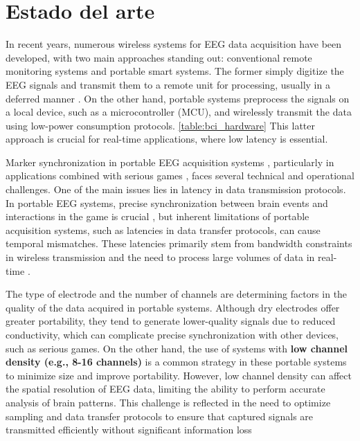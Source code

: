 \section{Estado del arte}\label{sec:stateofart}


In recent years, numerous wireless systems for EEG data acquisition have been developed, with two main approaches standing out: conventional remote monitoring systems and portable smart systems. The former simply digitize the EEG signals and transmit them to a remote unit for processing, usually in a deferred manner \cite{arpaia2020wearable}. On the other hand, portable systems preprocess the signals on a local device, such as a microcontroller (MCU), and wirelessly transmit the data using low-power consumption protocols. \ref{table:bci_hardware} This latter approach is crucial for real-time applications, where low latency is essential.

Marker synchronization in portable EEG acquisition systems \cite{razavi2022opensync}, particularly in applications combined with serious games \cite{damavsevivcius2023serious}, faces several technical and operational challenges. One of the main issues lies in latency in data transmission protocols. In portable EEG systems, precise synchronization between brain events and interactions in the game is crucial \cite{gomezromero2024implications}, but inherent limitations of portable acquisition systems, such as latencies in data transfer protocols, can cause temporal mismatches. These latencies primarily stem from bandwidth constraints in wireless transmission and the need to process large volumes of data in real-time \cite{he2023diversity}.

The type of electrode \cite{liu2023feature} and the number of channels \cite{abdullah2022eeg}  are determining factors in the quality of the data acquired in portable systems. Although dry electrodes offer greater portability, they tend to generate lower-quality signals due to reduced conductivity, which can complicate precise synchronization with other devices, such as serious games. On the other hand, the use of systems with \textbf{low channel density (e.g., 8-16 channels)} \cite{allouch2023effect} is a common strategy in these portable systems to minimize size and improve portability. However, low channel density can affect the spatial resolution of EEG data, limiting the ability to perform accurate analysis of brain patterns. This challenge is reflected in the need to optimize sampling \cite{zheng2023effects}  and data transfer protocols \cite{bayilmics2022survey}  to ensure that captured signals are transmitted efficiently without significant information loss

